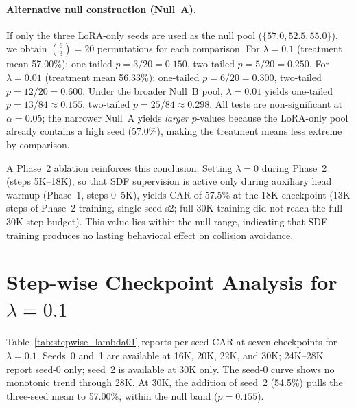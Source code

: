 \paragraph{Alternative null construction (Null~A).}
If only the three LoRA-only seeds are used as the null pool ($\{57.0, 52.5, 55.0\}$), we obtain $\binom{6}{3} = 20$ permutations for each comparison. For $\lambda = 0.1$ (treatment mean 57.00\%): one-tailed $p = 3/20 = 0.150$, two-tailed $p = 5/20 = 0.250$. For $\lambda = 0.01$ (treatment mean 56.33\%): one-tailed $p = 6/20 = 0.300$, two-tailed $p = 12/20 = 0.600$. Under the broader Null~B pool, $\lambda = 0.01$ yields one-tailed $p = 13/84 \approx 0.155$, two-tailed $p = 25/84 \approx 0.298$. All tests are non-significant at $\alpha = 0.05$; the narrower Null~A yields \emph{larger} $p$-values because the LoRA-only pool already contains a high seed (57.0\%), making the treatment means less extreme by comparison.

A Phase~2 ablation reinforces this conclusion. Setting $\lambda = 0$ during Phase~2 (steps 5K--18K), so that SDF supervision is active only during auxiliary head warmup (Phase~1, steps 0--5K), yields CAR of 57.5\% at the 18K checkpoint (13K steps of Phase~2 training, single seed s2; full 30K training did not reach the full 30K-step budget). This value lies within the null range, indicating that SDF training produces no lasting behavioral effect on collision avoidance.

\section{Step-wise Checkpoint Analysis for \texorpdfstring{$\lambda = 0.1$}{lambda = 0.1}}
\label{sec:appendix_stepwise}

Table~\ref{tab:stepwise_lambda01} reports per-seed CAR at seven checkpoints for $\lambda = 0.1$. Seeds~0 and~1 are available at 16K, 20K, 22K, and 30K; 24K--28K report seed-0 only; seed~2 is available at 30K only. The seed-0 curve shows no monotonic trend through 28K. At 30K, the addition of seed~2 (54.5\%) pulls the three-seed mean to 57.00\%, within the null band ($p = 0.155$).

